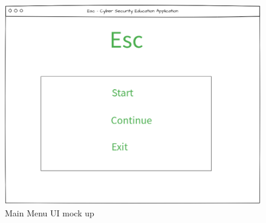\documentclass[12pt,a4paper]{article}
\begin{document}
\begin{figure}[h]
    \centering
    \includegraphics[width=1.0\textwidth]{Figs/Ui_main_menu.PNG} 
    \caption{Main Menu UI mock up} 
    \label{Mainmenu}
\end{figure}   
\end{document}
